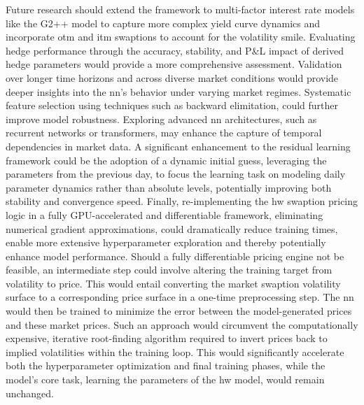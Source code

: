 Future research should extend the framework to multi-factor interest rate models like the G2++ model to capture more complex yield curve dynamics and incorporate \ac{otm} and \ac{itm} swaptions to account for the volatility smile. Evaluating hedge performance through the accuracy, stability, and P\&L impact of derived hedge parameters would provide a more comprehensive assessment. Validation over longer time horizons and across diverse market conditions would provide deeper insights into the \ac{nn}'s behavior under varying market regimes. Systematic feature selection using techniques such as backward elimitation, could further improve model robustness. Exploring advanced \ac{nn} architectures, such as recurrent networks or transformers, may enhance the capture of temporal dependencies in market data. A significant enhancement to the residual learning framework could be the adoption of a dynamic initial guess, leveraging the parameters from the previous day, to focus the learning task on modeling daily parameter dynamics rather than absolute levels, potentially improving both stability and convergence speed. Finally, re-implementing the \ac{hw} swaption pricing logic in a fully GPU-accelerated and differentiable framework, eliminating numerical gradient approximations, could dramatically reduce training times, enable more extensive hyperparameter exploration and thereby potentially enhance model performance. Should a fully differentiable pricing engine not be feasible, an intermediate step could involve altering the training target from volatility to price. This would entail converting the market swaption volatility surface to a corresponding price surface in a one-time preprocessing step. The \ac{nn} would then be trained to minimize the error between the model-generated prices and these market prices. Such an approach would circumvent the computationally expensive, iterative root-finding algorithm required to invert prices back to implied volatilities within the training loop. This would significantly accelerate both the hyperparameter optimization and final training phases, while the model's core task, learning the parameters of the \ac{hw} model, would remain unchanged.